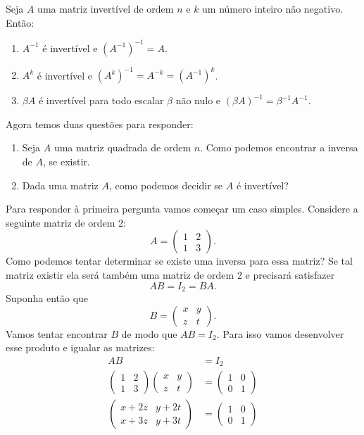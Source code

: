 \begin{proposicao}
    Seja $A$ uma matriz invertível de ordem $n$ e $k$ um número inteiro não negativo. Então:
    \begin{enumerate}[label={\roman*})]
        \item $A^{-1}$ é invertível e $(A^{-1})^{-1} = A$.

        \item $A^k$ é invertível e $(A^k)^{-1} = A^{-k} = (A^{-1})^k$.

        \item $\beta A$ é invertível para todo escalar $\beta$ não nulo e $(\beta A)^{-1} = \beta^{-1}A^{-1}$.
    \end{enumerate}
\end{proposicao}

Agora temos duas questões para responder:
\begin{enumerate}[label={\arabic*})]
    \item Seja $A$ uma matriz quadrada de ordem $n$. Como podemos encontrar a inversa de $A$, se existir.

    \item Dada uma matriz $A$, como podemos decidir se $A$ é invertível?
\end{enumerate}

Para responder à primeira pergunta vamos começar um caso simples. Considere a seguinte matriz de ordem 2:
\[
    A = \begin{pmatrix}
        1 & 2\\1 & 3
    \end{pmatrix}.
\]
Como podemos tentar determinar se existe uma inversa para essa matriz? Se tal matriz existir ela será também uma matriz de ordem 2 e precisará satisfazer
\[
    AB = I_2 = BA.
\]
Suponha então que
\[
    B = \begin{pmatrix}
        x & y\\z & t
    \end{pmatrix}.
\]
Vamos tentar encontrar $B$ de modo que $AB = I_2$. Para isso vamos desenvolver esse produto e igualar as matrizes:
\begin{align*}
    AB &= I_2\\
    \begin{pmatrix}1 & 2\\1 & 3\end{pmatrix}\begin{pmatrix}x & y\\z & t\end{pmatrix} &= \begin{pmatrix}1 & 0\\0 & 1\end{pmatrix}\\
    \begin{pmatrix}x + 2z & y + 2t\\x + 3z & y + 3t\end{pmatrix} &= \begin{pmatrix}1 & 0\\0 & 1\end{pmatrix}
\end{align*}

